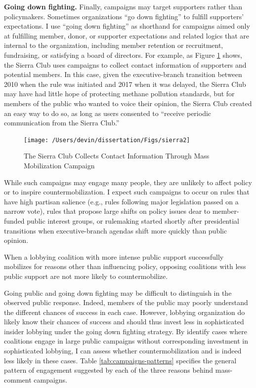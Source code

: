 \documentclass[
      12pt,
        ]{article}
\begin{document}
\textbf{Going down fighting.} Finally, campaigns may target supporters rather
than policymakers. Sometimes organizations ``go down fighting'' to fulfill
supporters' expectations. I use ``going down fighting'' as shorthand for
campaigns aimed only at fulfilling member, donor, or supporter
expectations and related logics that are internal to the organization,
including member retention or recruitment, fundraising, or satisfying a
board of directors. For example, as Figure
\ref{fig:sierra} shows, the Sierra Club uses campaigns to collect
contact information of supporters and potential members. In this case,
given the executive-branch transition between 2010 when the rule was
initiated and 2017 when it was delayed, the Sierra Club may have had
little hope of protecting methane pollution standards, but for members
of the public who wanted to voice their opinion, the Sierra Club created
an easy way to do so, as long as users consented to ``receive periodic
communication from the Sierra Club.''

\begin{figure}

{\centering \texttt{[image: /Users/devin/dissertation/Figs/sierra2]} 

}

\caption{The Sierra Club Collects Contact Information Through Mass Mobilization Campaign}\label{fig:sierra}
\end{figure}

While such campaigns may engage many people, they are unlikely to affect
policy or to inspire countermobilization. I expect such campaigns to
occur on rules that have high partisan salience (e.g., rules following
major legislation passed on a narrow vote), rules that propose large
shifts on policy issues dear to member-funded public interest groups, or
rulemaking started shortly after presidential transitions when
executive-branch agendas shift more quickly than public opinion.

When a lobbying coalition with more intense public support successfully
mobilizes for reasons other than influencing policy, opposing coalitions
with less public support are not more likely to countermobilize.

Going public and going down fighting may be difficult to distinguish in
the observed public response. Indeed, members of the public may poorly
understand the different chances of success in each case. However,
lobbying organization do likely know their chances of success and should
thus invest less in sophisticated insider lobbying under the going down
fighting strategy. By identify cases where coalitions engage in large
public campaigns without corresponding investment in sophisticated
lobbying, I can assess whether countermobilization and is indeed less
likely in these cases. Table
\ref{tab:campaigns-patterns} specifies the general pattern of
engagement suggested by each of the three reasons behind mass-comment
campaigns.
\end{document}
